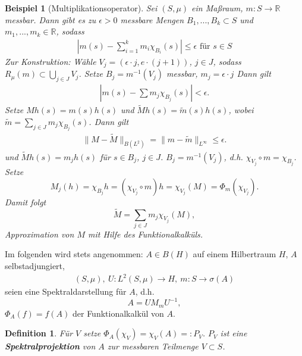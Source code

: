\documentclass[12pt]{extreport} %
\newtheorem{Definition}[Satz]{Definition}
\newtheorem{Beispiel}[Satz]{Beispiel}
\numberwithin{equation}{section}
\newcommand{\R}{\mathbb{R}} %
\newcommand{\m}{\cdot}
\begin{document}
	\begin{Beispiel}[Multiplikationsoperator]
		Sei $(S,\mu)$ ein Maßraum, $m:S\rightarrow \R$ messbar. Dann gibt es zu $\epsilon>0$ messbare Mengen $B_1,...,B_k\subset S$ und $m_1,...,m_k\in \R$, sodass 
		\begin{align*}
			\left|m(s)-\sum_{i = 1}^{k} m_i\chi_{B_i}(s)\right|\leq \epsilon \text{ für }s\in S
		\end{align*}
		Zur Konstruktion: Wähle $V_j = (\epsilon\m j, e\m ({j+1}))$, $j\in J$, sodass $R_\mu(m)\subset \bigcup_{j\in J}V_j$. Setze $B_j = m^{-1}(V_j)$ messbar, $m_j = \epsilon\m j$ Dann gilt 
		\begin{align*}
			\left|m(s)-\sum m_j\chi_{B_j}(s) \right|<\epsilon.
		\end{align*}
		Setze $Mh(s) = m(s) h(s)$ und $\tilde{M}h(s) = \tilde m(s) h(s)$, wobei $\tilde{m} = \sum_{j\in J} m_j \chi_{B_j}(s)$. Dann gilt
		\begin{align*}
			\| M-\tilde{M}\|_{B(L^2)} = \|m-\tilde{m}\|_{L^\infty}\leq \epsilon.
		\end{align*}
		und $\tilde{M}h(s) = m_j h(s)$ für $s\in B_j$, $j\in J$. $B_j = m^{-1}(V_j)$, d.h. $\chi_{V_j}\circ m = \chi_{B_j}$. Setze 
		$$M_j(h) = \chi_{B_j}h = (\chi_{V_j}\circ m)h = \chi_{V_j}(M) = \Phi_m(\chi_{V_j}).$$
		Damit folgt 
		$$\tilde{M} = \sum_{j\in J} m_j \chi_{V_j}(M),$$
		Approximation von $M$ mit Hilfe des Funktionalkalküls.
	\end{Beispiel}
	
	Im folgenden wird stets angenommen: $A\in B(H)$ auf einem Hilbertraum $H$, $A$ selbstadjungiert, 
	\begin{align*}
		(S,\mu),\ U:L^2(S,\mu)\rightarrow H,\ m:S\rightarrow\sigma(A)
	\end{align*}
	seien eine Spektraldarstellung für $A$, d.h. 
	$$A = UM_mU^{-1},$$
	$\Phi_A(f) = f(A)$ der Funktionalkalkül von $A$.
	
	\begin{Definition}
		Für $V$ setze $\Phi_A(\chi_V) = \chi_V(A) =: P_V$. $P_V$ ist eine \textbf{Spektralprojektion} von $A$ zur messbaren Teilmenge $V\subset S$.
	\end{Definition}
	
\end{document}
